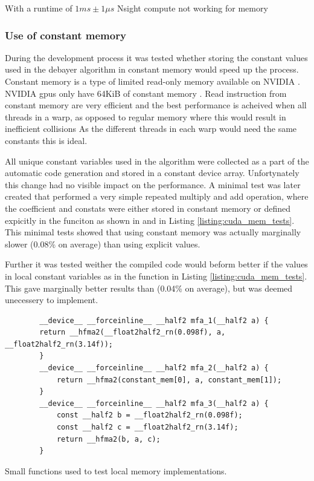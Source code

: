 With a runtime of $1 ms \pm 1 \mu s$
Nsight compute not working for memory







\subsubsection{Use of constant memory}
During the development process it was tested whether storing the constant values used in the debayer algorithm in constant memory would speed up the process.
Constant memory is a type of limited read-only memory available on NVIDIA  \cite[61]{nvidiaCUDABestPractices2023}.
NVIDIA \glspl{gpu} only have 64KiB of constant memory \cite[61]{nvidiaCUDABestPractices2023}.
Read instruction from constant memory are very efficient and the best performance is acheived when all threads in a warp, as opposed to regular memory where this would result in inefficient collisions \cite[61]{nvidiaCUDABestPractices2023} \cite[13,14]{volkovLatencyHiding2016}
As the different threads in each warp would need the same constants this is ideal.

All unique constant variables used in the algorithm were collected as a part of the automatic code generation and stored in a constant device array.
Unfortynately this change had no visible impact on the performance.
A minimal test was later created that performed a very simple repeated multiply and add operation, where the coefficient and constats were either stored in constant memory or defined expicitly in the funciton as shown in  and  in Listing \ref{listing:cuda_mem_tests}.
This minimal tests showed that using constant memory was actually marginally slower (0.08\% on average) than using explicit values.

Further it was tested weither the compiled code would beform better if the values in local constant variables as in the  function in Listing \ref{listing:cuda_mem_tests}.
This gave marginally better results than  (0.04\% on average), but was deemed unecessery to implement.

\begin{listing}[H]
    \begin{verbatim}
        __device__ __forceinline__ __half2 mfa_1(__half2 a) {
        return __hfma2(__float2half2_rn(0.098f), a, __float2half2_rn(3.14f));
        }
        __device__ __forceinline__ __half2 mfa_2(__half2 a) {
            return __hfma2(constant_mem[0], a, constant_mem[1]);
        }
        __device__ __forceinline__ __half2 mfa_3(__half2 a) {
            const __half2 b = __float2half2_rn(0.098f);
            const __half2 c = __float2half2_rn(3.14f);
            return __hfma2(b, a, c);
        }
    \end{verbatim}
    \caption{Small functions used to test local memory implementations.}
    \label{listing:cuda_mem_tests}
\end{listing}



